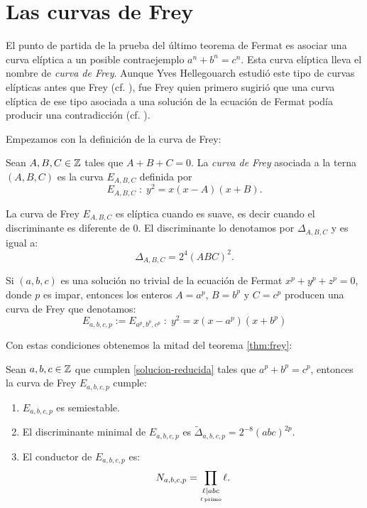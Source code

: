 \section{Las curvas de Frey}

El punto de partida de la prueba del último teorema de Fermat es asociar una curva elíptica a un posible contraejemplo $a^n+b^n=c^n$. Esta curva elíptica lleva el nombre de \emph{curva de Frey}. Aunque Yves Hellegouarch estudió este tipo de curvas elípticas antes que Frey (cf. \cite{Hellegouarch}), fue Frey quien primero sugirió que una curva elíptica de ese tipo asociada a una solución de la ecuación de Fermat podía producir una contradicción (cf. \cite{Frey86}).

Empezamos con la definición de la curva de Frey:

\begin{defin}
	Sean $A,B,C\in\mathbb{Z}$ tales que $A+B+C=0$. La \emph{curva de Frey} asociada a la terna $(A,B,C)$ es la curva $E_{A,B,C}$ definida por
	\[
		E_{A,B,C}\; : \; y^2=x(x-A)(x+B).
	\]
\end{defin}

\begin{nota}
	La curva de Frey $E_{A,B,C}$ es elíptica cuando es suave, es decir cuando el discriminante es diferente de 0.  El discriminante lo denotamos por $\Delta_{A,B,C}$ y es igual a:
	\begin{equation}\label{eq:disc-frey}
		\Delta_{A,B,C}=2^4(ABC)^2.
	\end{equation}

\end{nota}

Si $(a,b,c)$ es una solución no trivial de la ecuación de Fermat $x^p+y^p+z^p=0$, donde $p$ es impar, entonces los enteros $A=a^p$, $B=b^p$ y $C=c^p$ producen una curva de Frey que denotamos:
\[
	E_{a,b,c,p}:=E_{a^p,b^p,c^p}\; :\; y^2=x(x-a^p)(x+b^p)
\]

Con estas condiciones obtenemos la mitad del teorema \ref{thm:frey}:

\begin{prop}\label{prop:frey-semiestable}
	Sean $a,b,c\in\mathbb{Z}$ que cumplen \eqref{solucion-reducida} tales que $a^p+b^p=c^p$, entonces la curva de Frey $E_{a,b,c,p}$ cumple:
	\begin{enumerate}[label=(\roman*)]
	\item $E_{a,b,c,p}$ es semiestable.
	\item El discriminante minimal de $E_{a,b,c,p}$ es $\tilde{\Delta}_{a,b,c,p}=2^{-8}(abc)^{2p}$.
	\item El conductor de $E_{a,b,c,p}$ es:
	\[
		N_{a,b,c,p}=\prod_{\underset{\ell\,\mathrm{primo}}{\ell\mid abc}}\ell.
	\]
	\end{enumerate}
\end{prop}

